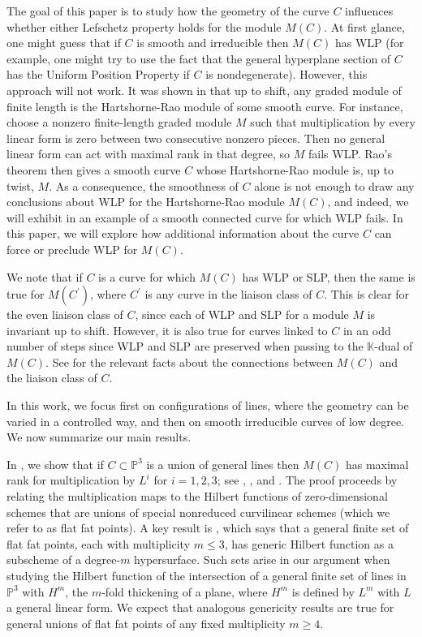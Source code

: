 \documentclass[12pt]{amsart}%
\numberwithin{equation}{section}
\theoremstyle{definition}
\numberwithin{equation}{section}
\newcounter{step}
\newcommand{\PP}{ \ensuremath{\mathbb{P}}}
\begin{document}
The goal of this paper is to study how the geometry of the curve $C$ influences whether either Lefschetz property holds for the  module $M(C)$. At first glance, one might guess that if $C$ is smooth and irreducible then $M(C)$ has WLP (for example, one might try to use the  fact that the general hyperplane section of $C$ has the Uniform Position Property \cite{harris} if $C$ is nondegenerate). However, this approach will not work.  It was shown in \cite{rao} that up to shift, any graded module of finite length is the Hartshorne-Rao module of some smooth curve. For instance, choose a nonzero finite-length graded module $M$ such that multiplication by every linear form is zero between two consecutive nonzero pieces. Then no general linear form can act with maximal rank in that degree, so $M$ fails WLP. Rao's theorem then gives a smooth curve $C$ whose Hartshorne-Rao module is, up to twist, $M$.
As a consequence, the smoothness of $C$ alone is not enough to draw any conclusions about WLP for the Hartshorne-Rao module $M(C)$, and indeed, we will exhibit in  an example of a smooth connected curve for which WLP fails. In this paper, we will explore how additional information about the curve $C$ can force or preclude WLP for $M(C)$.

We note that if $C$ is a curve for which $M(C)$ has WLP or SLP, then the same is true for $M(C^\prime)$, where $C^\prime$ is any curve in the liaison class of $C$. This is clear for the even liaison class of $C$, since each of WLP and SLP for a module $M$ is invariant up to shift. However, it is also true for curves linked to $C$ in an odd number of steps since WLP and SLP are preserved when passing to the $\mathbb K$-dual of $M(C)$. See \cite{rao} for the relevant facts about the connections between $M(C)$ and the liaison class of $C$.

In this work, we focus first on configurations of lines, where the geometry can be varied in a controlled way, and then on smooth irreducible curves of low degree. We now summarize our main results.

In , we show that if $C\subset \mathbb P^3$ is a union of general lines then $M(C)$ has maximal rank for multiplication by $L^i$ for $i=1,2,3$; see , , and .  The proof proceeds by relating the multiplication maps to the Hilbert functions of zero-dimensional schemes that are unions of special nonreduced curvilinear schemes (which we refer to as flat fat points). A key result is , which says that a general finite set of flat fat points, each with multiplicity $m \le 3$, has generic Hilbert function as a subscheme of a degree-$m$ hypersurface. Such sets arise in our argument when studying the Hilbert function of the intersection of a general finite set of lines in $\PP^3$ with $H^m$, the $m$-fold thickening of a plane, where $H^m$ is defined by $L^m$ with $L$ a general linear form. We expect that analogous genericity results are true for general unions of flat fat points of any fixed multiplicity $m \ge 4$. 
\end{document}

